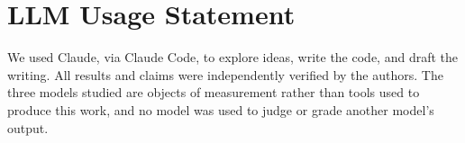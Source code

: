 \section*{LLM Usage Statement}
\label{sec:llmusage}

We used Claude, via Claude Code, to explore ideas, write the code, and draft the
writing. All results and claims were independently verified by the authors. The three
models studied are objects of measurement rather than tools used to produce this work,
and no model was used to judge or grade another model's output.
